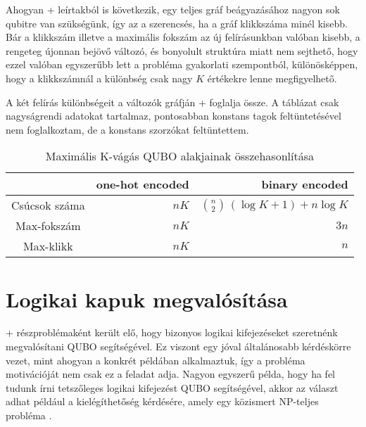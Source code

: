 Ahogyan \az+ leírtakból is következik, egy teljes gráf beágyazásához nagyon sok qubitre van szükségünk, így az a szerencsés, ha a gráf klikkszáma minél kisebb. Bár a klikkszám illetve a maximális fokszám az új felírásunkban valóban kisebb, a rengeteg újonnan bejövő változó, és bonyolult struktúra miatt nem sejthető, hogy ezzel valóban egyszerűbb lett a probléma gyakorlati szempontból, különösképpen, hogy a klikkszámnál a különbség csak nagy $K$ értékekre lenne megfigyelhető.

A két felírás különbségeit a változók gráfján \az+ foglalja össze. A táblázat csak nagyságrendi adatokat tartalmaz, pontosabban konstans tagok feltüntetésével nem foglalkoztam, de a konstans szorzókat feltüntettem.


\begin{table}[ht]
	\footnotesize
	\centering
	\begin{tabular}{ c r r }
		\toprule
		  & one-hot encoded & binary encoded \\
		\midrule
		Csúcsok száma  & $n K$   & $\binom{n}{2} \, ( \log K + 1 ) + n \log K$ \\
		Max-fokszám    & $n K$   & $3n$ \\
		Max-klikk      & $n K$   & $n$ \\		
		\bottomrule
	\end{tabular}
	\caption{Maximális K-vágás QUBO alakjainak összehasonlítása}
	\label{tab:diffMaxKCutFormulas}
\end{table}  

\section{Logikai kapuk megvalósítása}\label{sec:theoryLogicalGates}

\Az+ részproblémaként került elő, hogy bizonyos logikai kifejezéseket szeretnénk megvalósítani QUBO segítségével. Ez viszont egy jóval általánosabb kérdéskörre vezet, mint ahogyan a konkrét példában alkalmaztuk, így a probléma motivációját nem csak ez a feladat adja. Nagyon egyszerű példa, hogy ha fel tudunk írni tetszőleges logikai kifejezést QUBO segítségével, akkor az választ adhat például a kielégíthetőség kérdésére, amely egy közismert NP-teljes probléma \cite{algoritmusokBook}.

